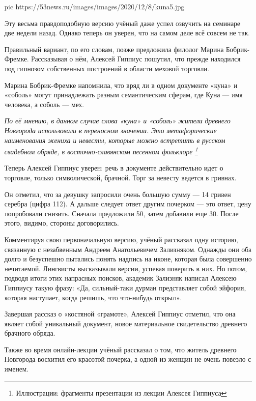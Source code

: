 \ifcmt
pic https://53news.ru/images/images/2020/12/8/kuna5.jpg
\fi

Эту весьма правдоподобную версию учёный даже успел озвучить на семинаре две
недели назад. Однако теперь он уверен, что на самом деле всё совсем не так.

Правильный вариант, по его словам, позже предложила филолог Марина
Бобрик-Фремке. Рассказывая о нём, Алексей Гиппиус пошутил, что прежде находился
под гипнозом собственных построений в области меховой торговли.

Марина Бобрик-Фремке напомнила, что вряд ли в одном документе «куна» и «соболь»
могут принадлежать разным семантическим сферам, где Куна — имя человека, а
соболь — мех.

\begin{leftbar}
	\begingroup
		\em По её мнению, в данном случае слова «куна» и «соболь» жители древнего
				Новгорода использовали в переносном значении. Это метафорические
				наименования жениха и невесты, которые можно встретить в русском
				свадебном обряде, в восточно-славянском песенном фольклоре
				\footnote{Иллюстрации: фрагменты презентации из лекции Алексея Гиппиуса}
	\endgroup
\end{leftbar}

Теперь Алексей Гиппиус уверен: речь в документе действительно идет о торговле,
только символической, брачной. Торг за невесту ведется в гривнах.

Он отметил, что за девушку запросили очень большую сумму — 14 гривен серебра
(цифра 112). А дальше следует ответ другим почерком — это ответ, цену
попробовали снизить. Сначала предложили 50, затем добавили еще 30. После этого,
видимо, стороны договорились.

Комментируя свою первоначальную версию, учёный рассказал одну историю,
связанную с незабвенным Андреем Анатольевичем Зализняком. Однажды они оба долго
и безуспешно пытались понять надпись на иконе, которая была совершенно
нечитаемой. Лингвисты высказывали версии, успевая поверить в них. Но потом,
подводя итоги этих напрасных поисков, академик Зализняк написал Алексею
Гиппиусу такую фразу: «Да, сильный-таки дурман представляет собой эйфория,
которая наступает, когда решишь, что что-нибудь открыл».

Завершая рассказ о «костяной «грамоте», Алексей Гиппиус отметил, что она являет
собой уникальный документ, новое материальное свидетельство древнего брачного
обряда.

Также во время онлайн-лекции учёный рассказал о том, что житель древнего
Новгорода восхитил его красотой почерка, а одной из женщин не очень повезло с
именем.
